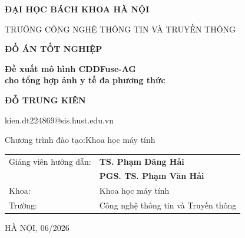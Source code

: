\begin{titlepage}
\centering

{\large\bfseries ĐẠI HỌC BÁCH KHOA HÀ NỘI\par}
\vspace{0.3cm}
{\normalsize TRƯỜNG CÔNG NGHỆ THÔNG TIN VÀ TRUYỀN THÔNG\par}

\vspace{2.5cm}

{\fontsize{32}{38}\bfseries ĐỒ ÁN TỐT NGHIỆP\par}

\vspace{1.2cm}

{\LARGE\bfseries
Đề xuất mô hình CDDFuse-AG\\[0.5em]
cho tổng hợp ảnh y tế đa phương thức\par}

\vspace{2cm}

{\Large\bfseries ĐỖ TRUNG KIÊN\par}
\vspace{0.3cm}
{\normalsize kien.dt224869@sis.hust.edu.vn\par}

\vspace{0.6cm}
{\normalsize Chương trình đào tạo:\quad Khoa học máy tính\par}

\vspace{2.5cm}

\begin{tabular}{@{}ll@{}}
Giảng viên hướng dẫn: & \textbf{TS. Phạm Đăng Hải} \\[4pt]
                       & \textbf{PGS. TS. Phạm Văn Hải} \\[8pt]
Khoa:                  & Khoa học máy tính \\[8pt]
Trường:                & Công nghệ thông tin và Truyền thông \\
\end{tabular}

\vfill
{\large HÀ NỘI, 06/2026\par}

\end{titlepage}

